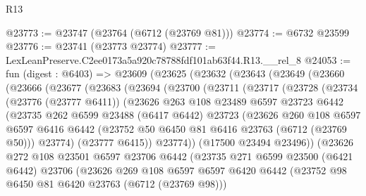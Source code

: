 \begin{lexlean}{R13}
\begin{coremodule}
@23773 := @23747 (@23764 (@6712 (@23769 @81)))
@23774 := @6732 @23599
@23776 := @23741 (@23773 @23774)
@23777 := LexLeanPreserve.C2ee0173a5a920c78788fdf101ab63f44.R13.__rel_8
@24053 := fun (digest : @6403) =>
  @23609
    (@23625
      (@23632
        (@23643
          (@23649
            (@23660
              (@23666
                (@23677
                  (@23683
                    (@23694
                      (@23700
                        (@23711
                          (@23717
                            (@23728
                              (@23734
                                (@23776 (@23777 @6411))
                                (@23626
                                  @263
                                  @108
                                  @23489
                                  @6597
                                  @23723
                                  @6442
                                  (@23735
                                    @262
                                    @6599
                                    @23488
                                    (@6417 @6442)
                                    @23723
                                    (@23626
                                      @260
                                      @108
                                      @6597
                                      @6597
                                      @6416
                                      @6442
                                      (@23752 @50 @6450 @81 @6416 @23763 (@6712 (@23769 @50)))
                                      @23774)
                                    (@23777 @6415))
                                  @23774))
                              (@17500 @23494 @23496))
                            (@23626
                              @272
                              @108
                              @23501
                              @6597
                              @23706
                              @6442
                              (@23735
                                @271
                                @6599
                                @23500
                                (@6421 @6442)
                                @23706
                                (@23626
                                  @269
                                  @108
                                  @6597
                                  @6597
                                  @6420
                                  @6442
                                  (@23752 @98 @6450 @81 @6420 @23763 (@6712 (@23769 @98)))

\end{coremodule}
\end{lexlean}
